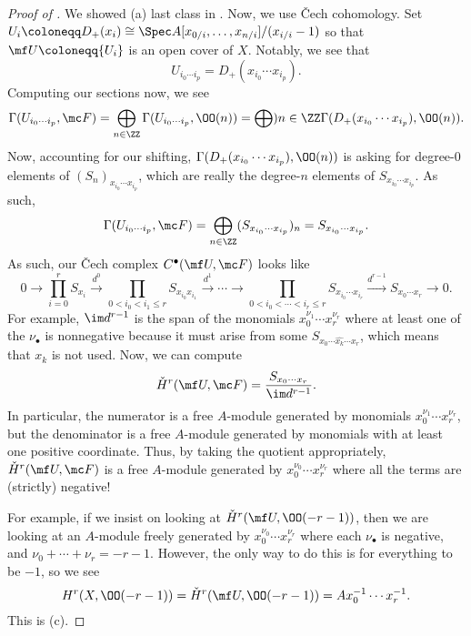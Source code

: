 \documentclass[../notes.tex]{subfiles}
\begin{document}
\begin{proof}[Proof of ]
	We showed (a) last class in . Now, we use \v Cech cohomology. Set $U_i\coloneqq D_+(x_i)\cong\Spec A[x_{0/i},\ldots,x_{n/i}]/(x_{i/i}-1)$ so that $\mf U\coloneqq\{U_i\}$ is an open cover of $X$. Notably, we see that
	\[U_{i_0\cdots i_p}=D_+(x_{i_0}\cdots x_{i_p}).\]
	Computing our sections now, we see
	\[\Gamma(U_{i_0\cdots i_p},\mc F)=\bigoplus_{n\in\ZZ}\Gamma(U_{i_0\cdots i_p},\OO(n))=\bigoplus){n\in\ZZ}\Gamma(D_+(x_{i_0}\cdots x_{i_p}),\OO(n)).\]
	Now, accounting for our shifting, $\Gamma(D_+(x_{i_0}\cdots x_{i_p}),\OO(n))$ is asking for degree-$0$ elements of $(S_n)_{x_{i_0}\cdots x_{i_p}}$, which are really the degree-$n$ elements of $S_{x_{i_0}\cdots x_{i_p}}$. As such,
	\[\Gamma(U_{i_0\cdots i_p},\mc F)=\bigoplus_{n\in\ZZ}(S_{x_{i_0}\cdots x_{i_p}})_n=S_{x_{i_0}\cdots x_{i_p}}.\]
	As such, our \v Cech complex $C^\bullet(\mf U,\mc F)$ looks like
	\begin{equation}
		0\to\prod_{i=0}^rS_{x_i}\xrightarrow{d^0}\prod_{0<i_0<i_1\le r}S_{x_{i_0}x_{i_1}}\xrightarrow{d^1}\cdots\to\prod_{0<i_0<\cdots<i_r\le r}S_{x_{i_0}\cdots x_{i_r}}\xrightarrow{d^{r-1}}S_{x_0\cdots x_r}\to0. \label{eq:proj-cech}
	\end{equation}
	For example, $\im d^{r-1}$ is the span of the monomials $x_0^{\nu_1}\cdots x_r^{\nu_r}$ where at least one of the $\nu_\bullet$ is nonnegative because it must arise from some $S_{x_0\cdots\widehat{x_k}\cdots x_r}$, which means that $x_k$ is not used. Now, we can compute
	\[\check H^r(\mf U,\mc F)=\frac{S_{x_0\cdots x_r}}{\im d^{r-1}}.\]
	In particular, the numerator is a free $A$-module generated by monomials $x_0^{\nu_1}\cdots x_r^{\nu_r}$, but the denominator is a free $A$-module generated by monomials with at least one positive coordinate. Thus, by taking the quotient appropriately, $\check H^r(\mf U,\mc F)$ is a free $A$-module generated by $x_0^{\nu_0}\cdots x_r^{\nu_r}$ where all the terms are (strictly) negative!

	For example, if we insist on looking at $\check H^r(\mf U,\OO(-r-1))$, then we are looking at an $A$-module freely generated by $x_0^{\nu_0}\cdots x_r^{\nu_r}$ where each $\nu_\bullet$ is negative, and $\nu_0+\cdots+\nu_r=-r-1$. However, the only way to do this is for everything to be $-1$, so we see
	\[H^r(X,\OO(-r-1))=\check H^r(\mf U,\OO(-r-1))=Ax_0^{-1}\cdots x_r^{-1}.\]
	This is (c).


\end{proof}
\end{document}
